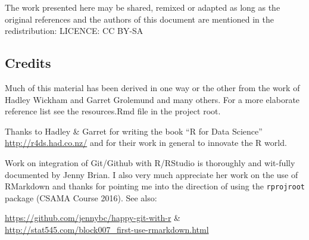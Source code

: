 \documentclass[]{article}
\begin{document}
The work presented here may be shared, remixed or adapted as long as the
original references and the authors of this document are mentioned in
the redistribution: LICENCE: CC BY-SA

\subsection{Credits}\label{credits}

Much of this material has been derived in one way or the other from the
work of Hadley Wickham and Garret Grolemund and many others. For a more
elaborate reference list see the resources.Rmd file in the project root.

Thanks to Hadley \& Garret for writing the book ``R for Data Science''
\url{http://r4ds.had.co.nz/} and for their work in general to innovate
the R world.

Work on integration of Git/Github with R/RStudio is thoroughly and
wit-fully documented by Jenny Brian. I also very much appreciate her
work on the use of RMarkdown and thanks for pointing me into the
direction of using the \texttt{rprojroot} package (CSAMA Course 2016).
See also:

\url{https://github.com/jennybc/happy-git-with-r} \&
\url{http://stat545.com/block007_first-use-rmarkdown.html}
\end{document}
